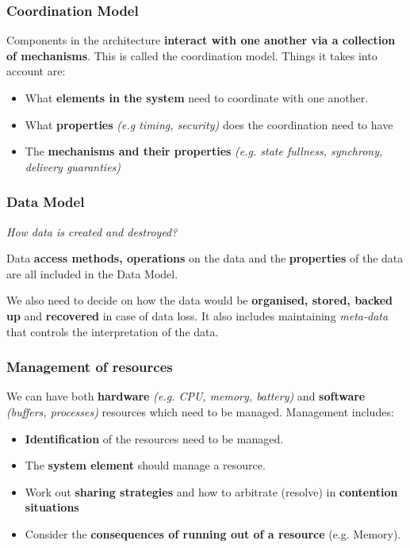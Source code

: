 \documentclass[a4paper]{article}
\begin{document}
\subsubsection{Coordination Model}
Components in the architecture \textbf{interact with one another via a collection of mechanisms}. This is called the coordination model. Things it takes into account are:
\begin{itemize}
\item What \textbf{elements in the system} need to coordinate with one another.
\item What \textbf{properties} \textit{(e.g timing, security)} does the coordination need to have
\item The \textbf{mechanisms and their properties} \textit{(e.g. state fullness, synchrony, delivery guaranties)}
\end{itemize}

\subsubsection{Data Model}

\textit{How data is created and destroyed?}

Data \textbf{access methods, operations} on the data and the \textbf{properties} of the data are all included in the Data Model. 

We also need to decide on how the data would be \textbf{organised, stored, backed up} and \textbf{recovered} in case of data loss. It also includes maintaining \textit{meta-data} that controls the interpretation of the data.


\subsubsection{Management of resources}
We can have both \textbf{hardware} \textit{(e.g. CPU, memory, battery)} and \textbf{software} \textit{(buffers, processes)} resources which need to be managed. Management includes:
\begin{itemize}
\item \textbf{Identification} of the resources need to be managed.
\item The \textbf{system element} should manage a resource.
\item Work out \textbf{sharing strategies} and how to arbitrate (resolve) in \textbf{contention situations}
\item Consider the \textbf{consequences of running out of a resource} (e.g. Memory).
\end{itemize}
\end{document}
